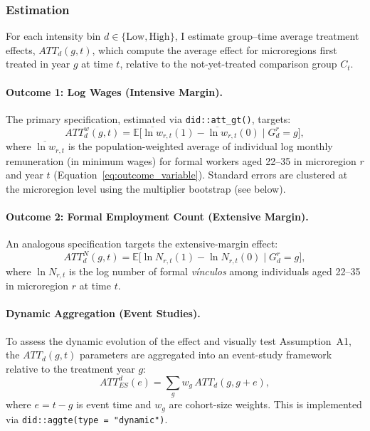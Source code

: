 \subsubsection{Estimation}
\label{sec:estimation_equations}

For each intensity bin $d \in \{\text{Low}, \text{High}\}$, I estimate group--time average treatment effects, $ATT_d(g,t)$, which compute the average effect for microregions first treated in year $g$ at time $t$, relative to the not-yet-treated comparison group $C_t$.

\paragraph{Outcome 1: Log Wages (Intensive Margin).}
The primary specification, estimated via \texttt{did::att\_gt()}, targets:
\begin{equation}
    ATT_d^w(g, t) = \mathbb{E}\bigl[\overline{\ln w}_{r,t}(1) - \overline{\ln w}_{r,t}(0) \mid G_d^r = g\bigr],
    \label{eq:main_wages}
\end{equation}
where $\overline{\ln w}_{r,t}$ is the population-weighted average of individual log monthly remuneration (in minimum wages) for formal workers aged 22--35 in microregion $r$ and year $t$ (Equation~\ref{eq:outcome_variable}). Standard errors are clustered at the microregion level using the multiplier bootstrap (see below).

\paragraph{Outcome 2: Formal Employment Count (Extensive Margin).}
An analogous specification targets the extensive-margin effect:
\begin{equation}
    ATT_d^N(g, t) = \mathbb{E}\bigl[\ln N_{r,t}(1) - \ln N_{r,t}(0) \mid G_d^r = g\bigr],
    \label{eq:main_employment}
\end{equation}
where $\ln N_{r,t}$ is the log number of formal \emph{v\'inculos} among individuals aged 22--35 in microregion $r$ at time $t$.

\paragraph{Dynamic Aggregation (Event Studies).}
To assess the dynamic evolution of the effect and visually test Assumption~A1, the $ATT_d(g,t)$ parameters are aggregated into an event-study framework relative to the treatment year $g$:
\begin{equation}
    ATT_{ES}^d(e) = \sum_{g} w_g \, ATT_d(g, g + e),
    \label{eq:event_study}
\end{equation}
where $e = t - g$ is event time and $w_g$ are cohort-size weights. This is implemented via \texttt{did::aggte(type = "dynamic")}.

